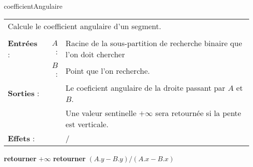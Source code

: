 \documentclass[10pt]{article}
\begin{document}
\begin{algorithm}
\caption{coefficientAngulaire}
\begin{tabular}{lrl}
\multicolumn{3}{l}{Calcule le coefficient angulaire d'un segment.}\\
&&\\
\textbf{Entrées} : &$A$ : &Racine de la sous-partition de recherche binaire que l'on doit chercher\\
&$B$ :&Point que l'on recherche.\\
\textbf{Sorties} :& &Le coeficient angulaire de la droite passant par $A$ et $B$.\\
& &Une valeur sentinelle $+\infty$ sera retournée si la pente est verticale.\\
\textbf{Effets} :& &/
\end{tabular}
\begin{algorithmic}[1]
\State \textbf{retourner} $+\infty$
\Else
\State \textbf{retourner} $(A.y-B.y)/(A.x-B.x)$
\EndIf
\EndProcedure
\end{algorithmic}
\end{algorithm}

\newpage
\end{document}
